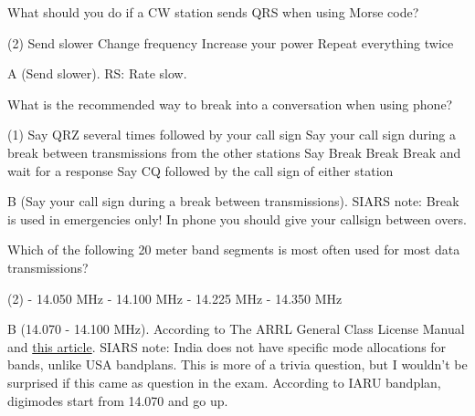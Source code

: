 \documentclass[a4paper]{article}
\begin{document}
\begin{question}What should you do if a CW station sends \apostrophe{}QRS\apostrophe{} when using Morse code?
	\begin{tasks}(2)
		\task Send slower
		\task Change frequency
		\task Increase your power
		\task Repeat everything twice
	\end{tasks}
\end{question}

\begin{solution}
	A (Send slower). RS: Rate slow.
\end{solution}

\vspace{5mm}



\begin{question}What is the recommended way to break into a conversation when using phone?
	\begin{tasks}(1)
		\task Say \apostrophe{}QRZ\apostrophe{} several times followed by your call sign
		\task Say your call sign during a break between transmissions from the other stations
		\task Say \apostrophe{}Break Break Break\apostrophe{} and wait for a response
		\task Say \apostrophe{}CQ\apostrophe{} followed by the call sign of either station
	\end{tasks}
\end{question}

\begin{solution}
	B (Say your call sign during a break between transmissions). SIARS note: Break is used in emergencies only! In phone you should give your callsign between overs.
\end{solution}

\vspace{5mm}



\begin{question}Which of the following 20 meter band segments is most often used for most data transmissions?
	\begin{tasks}(2)
		 - 14.050 MHz
		 - 14.100 MHz
		 - 14.225 MHz
		 - 14.350 MHz
	\end{tasks}
\end{question}

\begin{solution}
	B (14.070 - 14.100 MHz). According to \apostrophe{}The ARRL General Class License Manual\apostrophe{} and \href{https://www.qsl.net/sv1grb/psk31.htm}{this article}. SIARS note: India does not have specific mode allocations for bands, unlike USA bandplans. This is more of a trivia question, but I wouldn't be surprised if this came as question in the exam. According to IARU bandplan, digimodes start from 14.070 and go up.
\end{solution}
\end{document}
